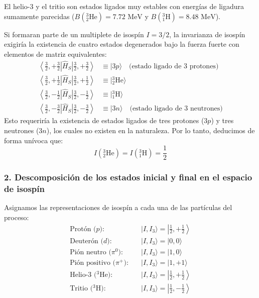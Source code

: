 \begin{observacion}[Deducción del isospín $I = 1/2$ para ${^3\text{He}}$ y ${^3\text{H}}$]
El helio-3 y el tritio son estados ligados muy estables con energías de ligadura sumamente parecidas ($B({^3_2\text{He}}) = 7.72\text{ MeV}$ y $B({^3_1\text{H}}) = 8.48\text{ MeV}$). 

Si formaran parte de un multiplete de isospín $I = 3/2$, la invarianza de isospín exigiría la existencia de cuatro estados degenerados bajo la fuerza fuerte con elementos de matriz equivalentes:
\begin{align}
    \left\langle \frac{3}{2}, +\frac{3}{2} \right| \hat{H}_S \left| \frac{3}{2}, +\frac{3}{2} \right\rangle &\equiv |3p\rangle \quad \text{(estado ligado de 3 protones)} \\
    \left\langle \frac{3}{2}, +\frac{1}{2} \right| \hat{H}_S \left| \frac{3}{2}, +\frac{1}{2} \right\rangle &\equiv |{^3_2\text{He}}\rangle \\
    \left\langle \frac{3}{2}, -\frac{1}{2} \right| \hat{H}_S \left| \frac{3}{2}, -\frac{1}{2} \right\rangle &\equiv |{^3_1\text{H}}\rangle \\
    \left\langle \frac{3}{2}, -\frac{3}{2} \right| \hat{H}_S \left| \frac{3}{2}, -\frac{3}{2} \right\rangle &\equiv |3n\rangle \quad \text{(estado ligado de 3 neutrones)}
\end{align}
Esto requeriría la existencia de estados ligados de tres protones ($3p$) y tres neutrones ($3n$), los cuales no existen en la naturaleza. Por lo tanto, deducimos de forma unívoca que:
\begin{equation}
    I({^3_2\text{He}}) = I({^3_1\text{H}}) = \frac{1}{2}
\end{equation}
\end{observacion}

\subsubsection*{2. Descomposición de los estados inicial y final en el espacio de isospín}

Asignamos las representaciones de isospín a cada una de las partículas del proceso:
\begin{align}
    \text{Protón ($p$):} \quad & |I, I_3\rangle = \left|\frac{1}{2}, +\frac{1}{2}\right\rangle \\
    \text{Deuterón ($d$):} \quad & |I, I_3\rangle = |0, 0\rangle \\
    \text{Pión neutro ($\pi^0$):} \quad & |I, I_3\rangle = |1, 0\rangle \\
    \text{Pión positivo ($\pi^+$):} \quad & |I, I_3\rangle = |1, +1\rangle \\
    \text{Helio-3 (${^3\text{He}}$):} \quad & |I, I_3\rangle = \left|\frac{1}{2}, +\frac{1}{2}\right\rangle \\
    \text{Tritio (${^3\text{H}}$):} \quad & |I, I_3\rangle = \left|\frac{1}{2}, -\frac{1}{2}\right\rangle
\end{align}

